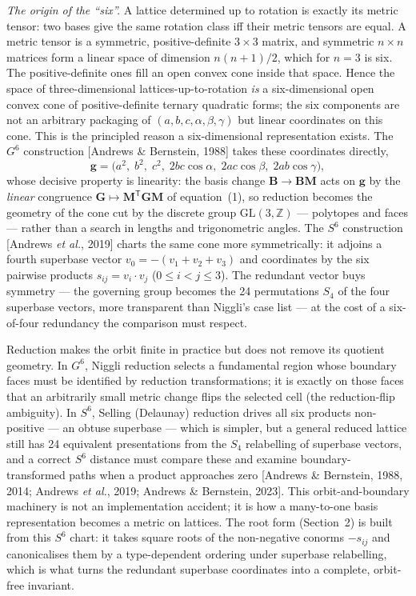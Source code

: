 \documentclass[11pt]{article}
\newcommand{\Gmet}{\mathbf{G}}
\newcommand{\Mop}{\mathbf{M}}
\newcommand{\Bbasis}{\mathbf{B}}
\begin{document}
\emph{The origin of the ``six''.} A lattice determined up to rotation is exactly
its metric tensor: two bases give the same rotation class iff their metric
tensors are equal. A metric tensor is a symmetric, positive-definite $3\times3$
matrix, and symmetric $n\times n$ matrices form a linear space of dimension
$n(n+1)/2$, which for $n=3$ is six. The positive-definite ones fill an open
convex cone inside that space. Hence the space of three-dimensional
lattices-up-to-rotation \emph{is} a six-dimensional open convex cone of
positive-definite ternary quadratic forms; the six components are not an
arbitrary packaging of $(a,b,c,\alpha,\beta,\gamma)$ but linear coordinates on
this cone. This is the principled reason a six-dimensional representation exists.
The $G^6$ construction [Andrews \& Bernstein, 1988] takes these coordinates
directly,
\begin{equation}
\mathbf{g} = \bigl(a^2,\; b^2,\; c^2,\; 2bc\cos\alpha,\; 2ac\cos\beta,\;
2ab\cos\gamma\bigr),
\end{equation}
whose decisive property is linearity: the basis change $\Bbasis \to \Bbasis\Mop$
acts on $\mathbf{g}$ by the \emph{linear} congruence $\Gmet \mapsto
\Mop^{\mathsf T}\Gmet\Mop$ of equation~(1), so reduction becomes the geometry of
the cone cut by the discrete group $\mathrm{GL}(3,\mathbb{Z})$ --- polytopes and
faces --- rather than a search in lengths and trigonometric angles. The $S^6$
construction [Andrews \textit{et al.}, 2019] charts the same cone more
symmetrically: it adjoins a fourth superbase vector $v_0 = -(v_1+v_2+v_3)$ and
coordinates by the six pairwise products $s_{ij} = v_i\!\cdot\!v_j$
($0 \le i < j \le 3$). The redundant vector buys symmetry --- the governing group
becomes the 24 permutations $S_4$ of the four superbase vectors, more transparent
than Niggli's case list --- at the cost of a six-of-four redundancy the
comparison must respect.

Reduction makes the orbit finite in practice but does not remove its quotient
geometry. In $G^6$, Niggli reduction selects a fundamental region whose boundary
faces must be identified by reduction transformations; it is exactly on those
faces that an arbitrarily small metric change flips the selected cell (the
reduction-flip ambiguity). In $S^6$, Selling (Delaunay) reduction drives all six
products non-positive --- an obtuse superbase --- which is simpler, but a general
reduced lattice still has 24 equivalent presentations from the $S_4$ relabelling
of superbase vectors, and a correct $S^6$ distance must compare these and examine
boundary-transformed paths when a product approaches zero [Andrews \& Bernstein,
1988, 2014; Andrews \textit{et al.}, 2019; Andrews \& Bernstein, 2023]. This
orbit-and-boundary machinery is not an implementation accident; it is how a
many-to-one basis representation becomes a metric on lattices. The root form
(Section~2) is built from this $S^6$ chart: it takes square roots of the
non-negative conorms $-s_{ij}$ and canonicalises them by a type-dependent
ordering under superbase relabelling, which is
what turns the redundant superbase coordinates into a complete, orbit-free
invariant.
\end{document}
